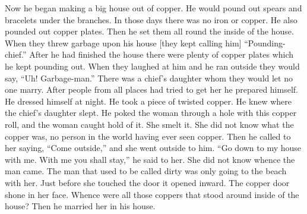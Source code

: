 Now he began making a big house out of copper.
He would pound out spears and bracelets under the branches.
In those days there was no iron or copper.
He also pounded out copper plates.
Then he set them all round the inside of the house.
When they threw garbage upon his house [they kept calling him] \qqk{}“Pounding-chief.”
After he had finished the house there were plenty of copper plates which he kept pounding out.
When they laughed at him and he ran outside they would say,
\qqk{}“Uh!
Garbage-man.”
There was a chief’s daughter whom they would let no one marry.
After people from all places had tried to get her he prepared himself.
He dressed himself at night.
He took a piece of twisted copper.
He knew where the chief’s daughter slept.
He poked the woman through a hole with this copper roll,
and the woman caught hold of it.
She smelt it.
She did not know what the copper was,
no person in the world having ever seen copper.
Then he called to her saying, “Come outside,”
and she went outside to him.
\qqk{}“Go down to my house with me.
With me you shall stay,”
he said to her.
She did not know whence the man came.
The man that used to be called dirty was only going to the beach with her.
Just before she touched the door it opened inward.
The copper door shone in her face.
Whence were all those coppers that stood around inside of the house?
Then he married her in his house.

